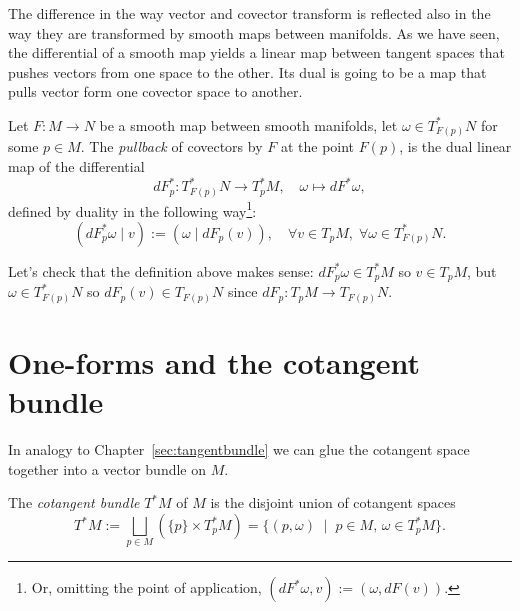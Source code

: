The difference in the way vector and covector transform is reflected also in the way they are transformed by smooth maps between manifolds.
As we have seen, the differential of a smooth map yields a linear map between tangent spaces that pushes vectors from one space to the other.
Its dual is going to be a map that pulls vector form one covector space to another.

\begin{definition}\label{def:pullback:oneform}
  Let $F:M\to N$ be a smooth map between smooth manifolds, let $\omega\in T^*_{F(p)}N$ for some $p\in M$.
  The \emph{pullback} of covectors by $F$ at the point $F(p)$, is the dual linear map of the differential
  \begin{equation}
    dF^*_p : T^*_{F(p)} N \to T^*_p M, \quad \omega \mapsto dF^*\omega,
  \end{equation}
  defined by duality in the following way\footnote{Or, omitting the point of application, $\left(dF^*\omega, v\right) := \left(\omega, dF(v)\right)$.}:
  \begin{equation}
    \left(dF^*_p\omega \mid v\right) := \left(\omega \mid dF_p(v)\right),\quad
    \forall v\in T_pM,\; \forall \omega\in T^*_{F(p)}N.
  \end{equation}
\end{definition}
\noindent Let's check that the definition above makes sense: $dF^*_p \omega \in T^*_p M$ so $v\in T_p M$, but $\omega\in T^*_{F(p)}N$ so $dF_p(v)\in T_{F(p)}N$ since $dF_p: T_pM\to T_{F(p)}N$.

\section{One-forms and the cotangent bundle}

In analogy to Chapter~\ref{sec:tangentbundle} we can glue the cotangent space together into a vector bundle on $M$.

\begin{definition}
  The \emph{cotangent bundle} $T^*M$ of $M$ is the disjoint union of cotangent spaces
  \begin{equation}
    T^*M := \bigsqcup_{p\in M}\left(\{p\}\times T^*_pM\right)
    = \{(p,\omega) \;\mid\; p\in M,\, \omega\in T^*_pM\}.
  \end{equation}
\end{definition}

